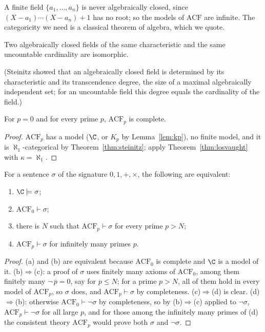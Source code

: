A finite field $\{a_1,\dots,a_n\}$ is never algebraically closed, since $(X-a_1)\cdots(X-a_n)+1$ has no root; so the models of $\mathrm{ACF}$ are infinite. The categoricity we need is a classical theorem of algebra, which we quote.

\begin{theorem}\label{thm:steinitz}
Two algebraically closed fields of the same characteristic and the same uncountable cardinality are isomorphic.
\end{theorem}

(Steinitz showed that an algebraically closed field is determined by its characteristic and its transcendence degree, the size of a maximal algebraically independent set; for an uncountable field this degree equals the cardinality of the field.)

\begin{corollary}\label{cor:acfcomplete}
For $p=0$ and for every prime $p$, $\mathrm{ACF}_p$ is complete.
\end{corollary}

\begin{proof}
$\mathrm{ACF}_p$ has a model ($\C$, or $K_p$ by Lemma~\ref{lem:kp}), no finite model, and it is $\aleph_1$-categorical by Theorem~\ref{thm:steinitz}; apply Theorem~\ref{thm:losvaught} with $\kappa=\aleph_1$.
\end{proof}

\begin{theorem}\label{thm:lefschetz}
For a sentence $\sigma$ of the signature $0,1,+,\times$, the following are equivalent:
\begin{enumerate}
\item $\C\models\sigma$;
\item $\mathrm{ACF}_0\vdash\sigma$;
\item there is $N$ such that $\mathrm{ACF}_p\vdash\sigma$ for every prime $p>N$;
\item $\mathrm{ACF}_p\vdash\sigma$ for infinitely many primes $p$.
\end{enumerate}
\end{theorem}

\begin{proof}
(a) and (b) are equivalent because $\mathrm{ACF}_0$ is complete and $\C$ is a model of it. (b)$\Rightarrow$(c): a proof of $\sigma$ uses finitely many axioms of $\mathrm{ACF}_0$, among them finitely many $\neg\,\overline p=0$, say for $p\le N$; for a prime $p>N$, all of them hold in every model of $\mathrm{ACF}_p$, so $\sigma$ does, and $\mathrm{ACF}_p\vdash\sigma$ by completeness. (c)$\Rightarrow$(d) is clear. (d)$\Rightarrow$(b): otherwise $\mathrm{ACF}_0\vdash\neg\sigma$ by completeness, so by (b)$\Rightarrow$(c) applied to $\neg\sigma$, $\mathrm{ACF}_p\vdash\neg\sigma$ for all large $p$, and for those among the infinitely many primes of (d) the consistent theory $\mathrm{ACF}_p$ would prove both $\sigma$ and $\neg\sigma$.
\end{proof}

